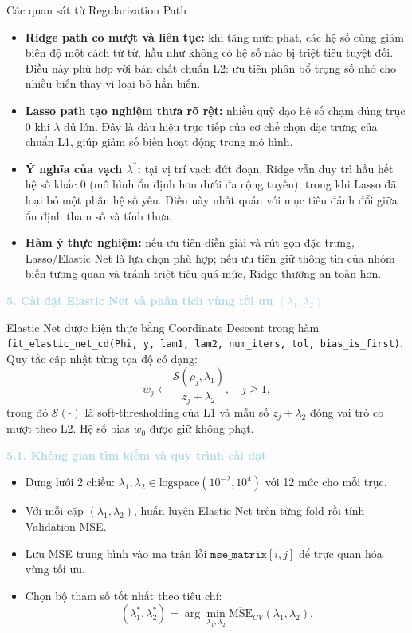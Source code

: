 \begin{notebox}{Các quan sát từ Regularization Path}
\begin{itemize}
    \item \textbf{Ridge path co mượt và liên tục:} khi tăng mức phạt, các hệ số cùng giảm biên độ một cách từ từ, hầu như không có hệ số nào bị triệt tiêu tuyệt đối. Điều này phù hợp với bản chất chuẩn L2: ưu tiên phân bổ trọng số nhỏ cho nhiều biến thay vì loại bỏ hẳn biến.
    \item \textbf{Lasso path tạo nghiệm thưa rõ rệt:} nhiều quỹ đạo hệ số chạm đúng trục 0 khi $\lambda$ đủ lớn. Đây là dấu hiệu trực tiếp của cơ chế chọn đặc trưng của chuẩn L1, giúp giảm số biến hoạt động trong mô hình.
    \item \textbf{Ý nghĩa của vạch $\lambda^{\ast}$:} tại vị trí vạch đứt đoạn, Ridge vẫn duy trì hầu hết hệ số khác 0 (mô hình ổn định hơn dưới đa cộng tuyến), trong khi Lasso đã loại bỏ một phần hệ số yếu. Điều này nhất quán với mục tiêu đánh đổi giữa ổn định tham số và tính thưa.
    \item \textbf{Hàm ý thực nghiệm:} nếu ưu tiên diễn giải và rút gọn đặc trưng, Lasso/Elastic Net là lựa chọn phù hợp; nếu ưu tiên giữ thông tin của nhóm biến tương quan và tránh triệt tiêu quá mức, Ridge thường an toàn hơn.
\end{itemize}
\end{notebox}

\noindent\textcolor{lightblue}{\textbf{5. Cài đặt Elastic Net và phân tích vùng tối ưu $(\lambda_1,\lambda_2)$}}

Elastic Net được hiện thực bằng Coordinate Descent trong hàm
\texttt{fit\_elastic\_net\_cd(Phi, y, lam1, lam2, num\_iters, tol, bias\_is\_first)}. Quy tắc cập nhật từng tọa độ có dạng:
\begin{equation}
w_j \leftarrow \frac{\mathcal{S}(\rho_j,\lambda_1)}{z_j+\lambda_2},\quad j\ge 1,
\end{equation}
trong đó $\mathcal{S}(\cdot)$ là soft-thresholding của L1 và mẫu số $z_j+\lambda_2$
đóng vai trò co mượt theo L2. Hệ số bias $w_0$ được giữ không phạt.

\noindent\textcolor{lightblue}{\textbf{5.1. Không gian tìm kiếm và quy trình cài đặt}}
\begin{itemize} [labelsep=10pt, leftmargin=2cm]
    \item Dựng lưới 2 chiều: $\lambda_1,\lambda_2 \in \text{logspace}(10^{-2},10^{4})$ với 12 mức cho mỗi trục.
    \item Với mỗi cặp $(\lambda_1,\lambda_2)$, huấn luyện Elastic Net trên từng fold rồi tính Validation MSE.
    \item Lưu MSE trung bình vào ma trận lỗi $\texttt{mse\_matrix}[i,j]$ để trực quan hóa vùng tối ưu.
    \item Chọn bộ tham số tốt nhất theo tiêu chí:
    \begin{equation}
    (\lambda_1^{\ast},\lambda_2^{\ast})=\arg\min_{\lambda_1,\lambda_2}\overline{\text{MSE}}_{CV}(\lambda_1,\lambda_2).
    \end{equation}
\end{itemize}


